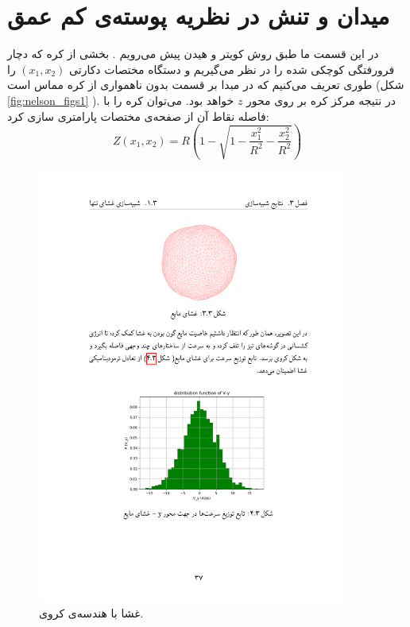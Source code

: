 \section{میدان و تنش در نظریه پوسته‌ی کم عمق}
در این قسمت ما طبق روش کویتر
و
هیدن
پیش می‌‌رویم
\cite{Heijden2008WTK}
. بخشی از کره که دچار فرورفتگی کوچکی شده را در نظر می‌گیریم و دستگاه مختصات دکارتی 
$(x_1,x_2)$
را طوری تعریف می‌کنیم که در مبدا بر قسمت بدون ناهمواری از کره مماس است (شکل 
\ref{fig:nelson_figs1}
). در نتیجه مرکز کره بر روی محور 
$z$
خواهد بود. می‌توان کره را با فاصله نقاط آن از صفحه‌ی مختصات پارامتری سازی کرد:
\begin{equation}
Z(x_1,x_2) = R\left(1-\sqrt{1-\frac{x_1^2}{R^2}-\frac{x_2^2}{R^2}}\right)
\label{eq:nelsonS1}
\end{equation}
\begin{figure}[h]
\begin{center}
\includegraphics[width=4in]{Figs/mem_sim1}
\caption{
غشا با هندسه‌ی کروی.
}
\label{fig:mem1}
\end{center}
\end{figure}
